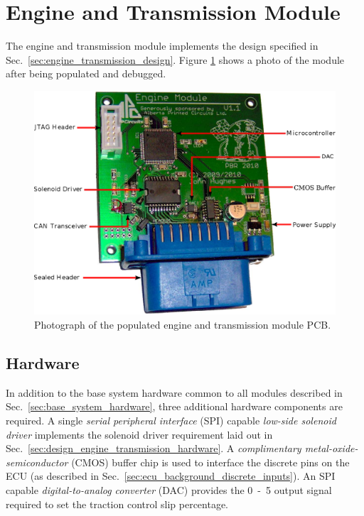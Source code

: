 \section{Engine and Transmission Module}

The engine and transmission module implements the design specified in Sec.\ \ref{sec:engine_transmission_design}. Figure \ref{fig:engine_transmission_pcb} shows a photo of the module after being populated and debugged.

\begin{figure}[H]
\centering
\includegraphics[scale=1]{implementation/figures/engine_transmission_pcb}
\caption{Photograph of the populated engine and transmission module PCB.}
\label{fig:engine_transmission_pcb}
\end{figure}

\subsection{Hardware}

In addition to the base system hardware common to all modules described in Sec.\ \ref{sec:base_system_hardware}, three additional hardware components are required. A single \emph{serial peripheral interface} (SPI) capable \emph{low-side solenoid driver} implements the solenoid driver requirement laid out in Sec.\ \ref{sec:design_engine_transmission_hardware}. A \emph{complimentary metal-oxide-semiconductor} (CMOS) buffer chip is used to interface the discrete pins on the ECU (as described in Sec.\ \ref{sec:ecu_background_discrete_inputs}). An SPI capable \emph{digital-to-analog converter} (DAC) provides the \unit{0-5}{\volt} output signal required to set the traction control slip percentage.

